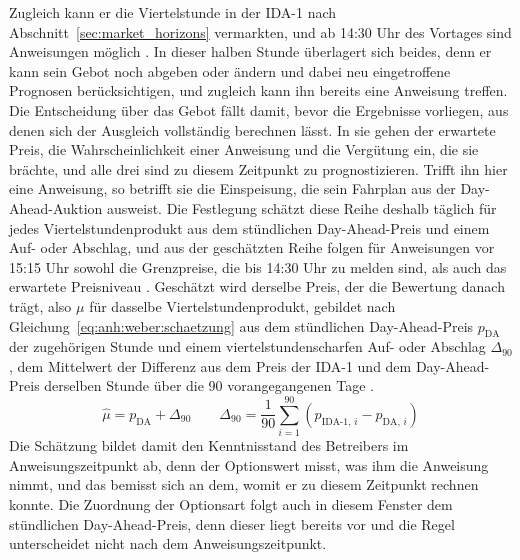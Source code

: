 Zugleich kann er die Viertelstunde in der \ac{IDA-1} nach Abschnitt~\ref{sec:market_horizons} vermarkten, und ab 14:30 Uhr des Vortages sind Anweisungen möglich \cite{bundesnetzagentur_anlage1_2024}. In dieser halben Stunde überlagert sich beides, denn er kann sein Gebot noch abgeben oder ändern und dabei neu eingetroffene Prognosen berücksichtigen, und zugleich kann ihn bereits eine Anweisung treffen. Die Entscheidung über das Gebot fällt damit, bevor die Ergebnisse vorliegen, aus denen sich der Ausgleich vollständig berechnen lässt. In sie gehen der erwartete Preis, die Wahrscheinlichkeit einer Anweisung und die Vergütung ein, die sie brächte, und alle drei sind zu diesem Zeitpunkt zu prognostizieren. Trifft ihn hier eine Anweisung, so betrifft sie die Einspeisung, die sein Fahrplan aus der Day-Ahead-Auktion ausweist. Die Festlegung schätzt diese Reihe deshalb täglich für jedes Viertelstundenprodukt aus dem stündlichen Day-Ahead-Preis und einem Auf- oder Abschlag, und aus der geschätzten Reihe folgen für Anweisungen vor 15:15 Uhr sowohl die Grenzpreise, die bis 14:30 Uhr zu melden sind, als auch das erwartete Preisniveau \cite{bundesnetzagentur_anlage1_2024}. Geschätzt wird derselbe Preis, der die Bewertung danach trägt, also $\mu$ für dasselbe Viertelstundenprodukt, gebildet nach Gleichung~\eqref{eq:anh:weber:schaetzung} aus dem stündlichen Day-Ahead-Preis $p_{\mathrm{DA}}$ der zugehörigen Stunde und einem viertelstundenscharfen Auf- oder Abschlag $\Delta_{90}$, dem Mittelwert der Differenz aus dem Preis der \ac{IDA-1} und dem Day-Ahead-Preis derselben Stunde über die 90 vorangegangenen Tage \cite{bundesnetzagentur_anlage1_2024}.
\begin{equation}
  \hat{\mu} = p_{\mathrm{DA}} + \Delta_{90}
  \qquad
  \Delta_{90} = \frac{1}{90} \sum_{i=1}^{90} \left( p_{\mathrm{IDA\text{-}1},\,i} - p_{\mathrm{DA},\,i} \right)
  \label{eq:anh:weber:schaetzung}
\end{equation}
Die Schätzung bildet damit den Kenntnisstand des Betreibers im Anweisungszeitpunkt ab, denn der Optionswert misst, was ihm die Anweisung nimmt, und das bemisst sich an dem, womit er zu diesem Zeitpunkt rechnen konnte. Die Zuordnung der Optionsart folgt auch in diesem Fenster dem stündlichen Day-Ahead-Preis, denn dieser liegt bereits vor und die Regel unterscheidet nicht nach dem Anweisungszeitpunkt.

